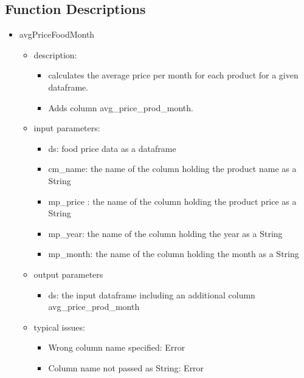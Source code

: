 \documentclass[11pt]{article}
\begin{document}
\subsection{Function Descriptions}
\begin{itemize}
\item avgPriceFoodMonth
	\begin{itemize}
	\item description: 
		\begin{itemize}
		\item calculates the average price per month for each product for a given dataframe. 
		\item Adds column avg\_price\_prod\_month.
		\end{itemize}
	\item input parameters: 
		\begin{itemize}
		\item ds: food price data as a dataframe 
		\item cm\_name: the name of the column holding the product name as a String        
		\item mp\_price : the name of the column holding the product price as a String        
		\item mp\_year: the name of the column holding the year as a String       
		\item mp\_month: the name of the column holding the month as a String
		\end{itemize}
	\item output parameters
		\begin{itemize}
		\item ds: the input dataframe including an additional column avg\_price\_prod\_month
		\end{itemize}
	\item typical issues:
		\begin{itemize}
		\item Wrong column name specified: Error  
		\item Column name not passed as String: Error
		\end{itemize}
	\end{itemize}



\end{itemize}
\end{document}
